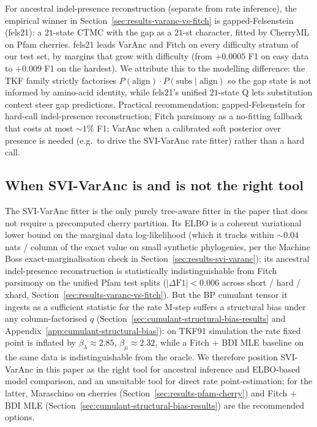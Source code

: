 For ancestral indel-presence reconstruction (separate from rate
inference), the empirical winner in
Section~\ref{sec:results-varanc-vs-fitch} is gapped-Felsenstein
(fels21): a $21$-state CTMC with the gap as a $21$-st character,
fitted by CherryML on Pfam cherries.  fels21 leads VarAnc and
Fitch on every difficulty stratum of our test set, by margins
that grow with difficulty (from $+0.0005$ F1 on easy data to
$+0.009$ F1 on the hardest).  We attribute this to the modelling
difference: the TKF family strictly factorises
$P(\text{align}) \cdot P(\text{subs} \mid \text{align})$ so the
gap state is not informed by amino-acid identity, while fels21's
unified $21$-state Q lets substitution context steer gap
predictions.  Practical recommendation: gapped-Felsenstein for
hard-call indel-presence reconstruction; Fitch parsimony as a
no-fitting fallback that costs at most $\sim 1\%$ F1; VarAnc
when a calibrated soft posterior over presence is needed (e.g.\
to drive the SVI-VarAnc rate fitter) rather than a hard call.

\subsection{When SVI-VarAnc is and is not the right tool}
\label{sec:discussion-svi-varanc}

The SVI-VarAnc fitter is the only purely tree-aware fitter in the
paper that does not require a precomputed cherry partition.  Its
ELBO is a coherent variational lower bound on the marginal data
log-likelihood (which it tracks within $\sim 0.04$ nats / column
of the exact value on small synthetic phylogenies, per the
Machine Boss exact-marginalisation check in
Section~\ref{sec:results-svi-varanc}); its ancestral
indel-presence reconstruction is statistically indistinguishable
from Fitch parsimony on the unified Pfam test splits
($|\Delta\text{F1}| < 0.006$ across short / hard / xhard,
Section~\ref{sec:results-varanc-vs-fitch}).  But the BP cumulant
tensor it ingests as a sufficient statistic for the rate M-step
suffers a structural bias under any column-factorised $q$
(Section~\ref{sec:cumulant-structural-bias-results} and
Appendix~\ref{app:cumulant-structural-bias}): on TKF91 simulation
the rate fixed point is inflated by $\beta_\lambda \approx 2.85$,
$\beta_\mu \approx 2.32$, while a Fitch + BDI MLE baseline on the
same data is indistinguishable from the oracle.  We therefore
position SVI-VarAnc in this paper as the right tool for ancestral
inference and ELBO-based model comparison, and an unsuitable tool
for direct rate point-estimation; for the latter, Maraschino on
cherries (Section~\ref{sec:results-pfam-cherry}) and Fitch + BDI
MLE (Section~\ref{sec:cumulant-structural-bias-results}) are the
recommended options.

